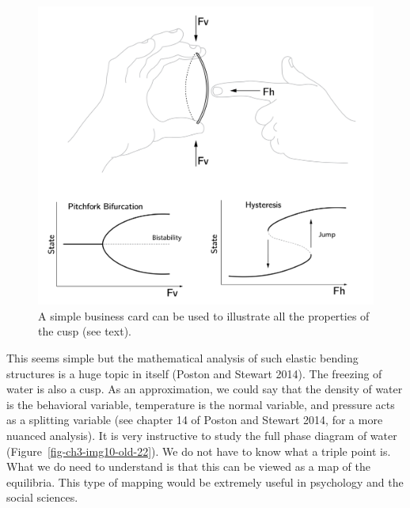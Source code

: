 \documentclass[
  a4paper,
  DIV=11,
  numbers=noendperiod,
  oneside]{scrreprt}
\begin{document}
\begin{figure}

{\centering \includegraphics{media/ch3/ch3-11__figure23.png}

}

\caption{\label{fig-ch3-img11-old-23}A simple business card can be used
to illustrate all the properties of the cusp (see text).}

\end{figure}

This seems simple but the mathematical analysis of such elastic bending
structures is a huge topic in itself (Poston and Stewart 2014). The
freezing of water is also a cusp. As an approximation, we could say that
the density of water is the behavioral variable, temperature is the
normal variable, and pressure acts as a splitting variable (see chapter
14 of Poston and Stewart 2014, for a more nuanced analysis). It is very
instructive to study the full phase diagram of water
(Figure~\ref{fig-ch3-img10-old-22}). We do not have to know what a
triple point is. What we do need to understand is that this can be
viewed as a map of the equilibria. This type of mapping would be
extremely useful in psychology and the social sciences.
\end{document}
